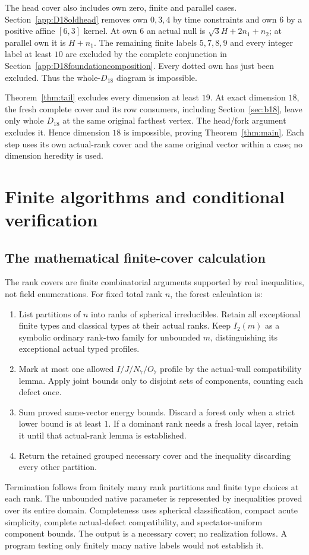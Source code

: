 \documentclass[11pt]{article}
\theoremstyle{definition}
\theoremstyle{remark}
\begin{document}
The head cover also includes own zero, finite and parallel
cases. Section~\ref{app:D18oldhead} removes own
\(0,3,4\) by time constraints and own \(6\) by a positive
affine \([6,3]\) kernel. At own \(6\) an actual null is
\(\sqrt3H+2n_1+n_2\); at parallel own it is \(H+n_1\).
The remaining finite labels \(5,7,8,9\) and every integer
label at least \(10\) are excluded by the complete conjunction in
Section~\ref{app:D18foundationcomposition}. Every dotted own has just been excluded.
Thus the whole-\(D_{18}\) diagram is impossible.

Theorem~\ref{thm:tail} excludes every dimension at least \(19\).
At exact dimension \(18\), the fresh complete cover and its
row consumers, including Section~\ref{sec:b18}, leave only
whole \(D_{18}\) at the same original farthest vertex.
The head/fork argument excludes it. Hence dimension \(18\)
is impossible, proving Theorem~\ref{thm:main}. Each step uses its
own actual-rank cover and the same original vector within a case;
no dimension heredity is used.

\section{Finite algorithms and conditional verification}
\label{sec:verification}
\subsection{The mathematical finite-cover calculation}
The rank covers are finite combinatorial arguments supported
by real inequalities, not field enumerations.
For fixed total rank \(n\), the forest calculation is:
\begin{enumerate}
\item List partitions of \(n\) into ranks of spherical irreducibles.
 Retain all exceptional finite types and classical types at
 their actual ranks. Keep \(I_2(m)\) as a symbolic ordinary
 rank-two family for unbounded \(m\), distinguishing its
 exceptional actual typed profiles.
\item Mark at most one allowed \(I/J/N_7/O_7\) profile by the
 actual-wall compatibility lemma. Apply joint bounds only to
 disjoint sets of components, counting each defect once.
\item Sum proved same-vector energy bounds. Discard a forest only
 when a strict lower bound is at least \(1\). If a dominant
 rank needs a fresh local layer, retain it until that
 actual-rank lemma is established.
\item Return the retained grouped necessary cover and the
 inequality discarding every other partition.
\end{enumerate}
Termination follows from finitely many rank partitions and
finite type choices at each rank. The unbounded native
parameter is represented by inequalities proved over its
entire domain. Completeness uses spherical classification,
compact acute simplicity, complete actual-defect compatibility,
and spectator-uniform component bounds. The output is a
necessary cover; no realization follows. A program testing
only finitely many native labels would not establish it.
\end{document}
